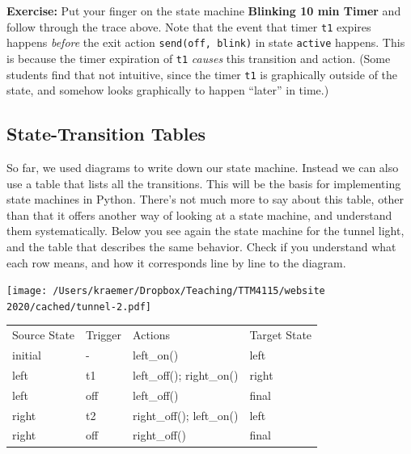 \documentclass[10pt, twoside, twocolumn]{book}
\let\origfigure=\figure
\let\endorigfigure=\endfigure
\renewenvironment{figure}[1][]{%
  \origfigure[H]
}{%
  \endorigfigure
}
\begin{document}
\textbf{Exercise:} Put your finger on the state machine \textbf{Blinking
10 min Timer} and follow through the trace above. Note that the event
that timer \texttt{t1} expires happens \emph{before} the exit action
\texttt{send(off,\ blink)} in state \texttt{active} happens. This is
because the timer expiration of \texttt{t1} \emph{causes} this
transition and action. (Some students find that not intuitive, since the
timer \texttt{t1} is graphically outside of the state, and somehow looks
graphically to happen ``later'' in time.)

\hypertarget{state-transition-tables}{%
\subsection{State-Transition Tables}\label{state-transition-tables}}

So far, we used diagrams to write down our state machine. Instead we can
also use a table that lists all the transitions. This will be the basis
for implementing state machines in Python. There's not much more to say
about this table, other than that it offers another way of looking at a
state machine, and understand them systematically. Below you see again
the state machine for the tunnel light, and the table that describes the
same behavior. Check if you understand what each row means, and how it
corresponds line by line to the diagram.

\begin{figure}[htbp]
\begin{center}
\texttt{[image: /Users/kraemer/Dropbox/Teaching/TTM4115/website 2020/cached/tunnel-2.pdf]}%
\label{default}
\end{center}
\end{figure}
\begin{table}[t]
\begin{tabulary}{\textwidth}{LLLL}
\toprule
Source State
&Trigger
&Actions
&Target State
\\
initial
&-
&left\_on()
&left
\\
left
&t1
&left\_off(); right\_on()
&right
\\
left
&off
&left\_off()
&final
\\
right
&t2
&right\_off(); left\_on()
&left
\\
right
&off
&right\_off()
&final
\\
\bottomrule
\end{tabulary}
\end{table}
\end{document}
